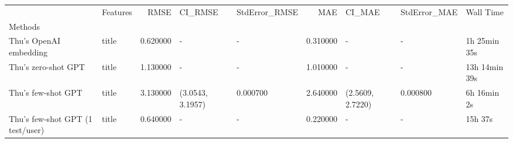 \begin{tabular}{llrllrlll}
 & Features & RMSE & CI_RMSE & StdError_RMSE & MAE & CI_MAE & StdError_MAE & Wall Time \\
Methods &  &  &  &  &  &  &  &  \\
Thu's OpenAI embedding & title & 0.620000 & - & - & 0.310000 & - & - & 1h 25min 35s \\
Thu's zero-shot GPT & title & 1.130000 & - & - & 1.010000 & - & - & 13h 14min 39s \\
Thu's few-shot GPT & title & 3.130000 & (3.0543, 3.1957) & 0.000700 & 2.640000 & (2.5609, 2.7220) & 0.000800 & 6h 16min 2s \\
Thu's few-shot GPT (1 test/user) & title & 0.640000 & - & - & 0.220000 & - & - & 15h 37s \\
\end{tabular}
